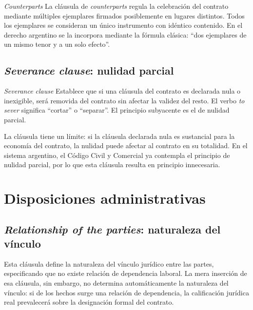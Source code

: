 \documentclass[12pt,oneside]{book}
\begin{document}
\begin{definition}{\textit{Counterparts}}
La cláusula de \textit{counterparts} regula la celebración del contrato mediante múltiples ejemplares firmados posiblemente en lugares distintos. Todos los ejemplares se consideran un único instrumento con idéntico contenido. En el derecho argentino se la incorpora mediante la fórmula clásica: ``dos ejemplares de un mismo tenor y a un solo efecto''.
\end{definition}

\subsection{\textit{Severance clause}: nulidad parcial}

\begin{definition}{\textit{Severance clause}}
Establece que si una cláusula del contrato es declarada nula o inexigible, será removida del contrato sin afectar la validez del resto. El verbo \textit{to sever} significa ``cortar'' o ``separar''. El principio subyacente es el de nulidad parcial.
\end{definition}

\begin{important}
La cláusula tiene un límite: si la cláusula declarada nula es sustancial para la economía del contrato, la nulidad puede afectar al contrato en su totalidad. En el sistema argentino, el Código Civil y Comercial ya contempla el principio de nulidad parcial, por lo que esta cláusula resulta en principio innecesaria.
\end{important}

\section{Disposiciones administrativas}

\subsection{\textit{Relationship of the parties}: naturaleza del vínculo}

Esta cláusula define la naturaleza del vínculo jurídico entre las partes, especificando que no existe relación de dependencia laboral. La mera inserción de esa cláusula, sin embargo, no determina automáticamente la naturaleza del vínculo: si de los hechos surge una relación de dependencia, la calificación jurídica real prevalecerá sobre la designación formal del contrato.
\end{document}
